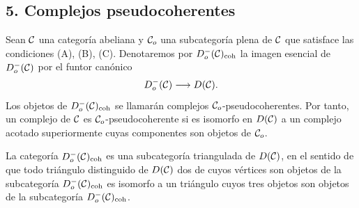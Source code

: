 \subsection*{5. Complejos pseudocoherentes}

Sean $\mathcal C$ una categoría abeliana y $\mathcal C_o$ una subcategoría plena de $\mathcal C$ que satisface las condiciones (A), (B), (C). Denotaremos por $D_o^-(\mathcal C)_{\mathrm{coh}}$ la imagen esencial de $D_o^-(\mathcal C)$ por el funtor canónico
\[
D_o^-(\mathcal C)\longrightarrow D(\mathcal C).
\]
Los objetos de $D_o^-(\mathcal C)_{\mathrm{coh}}$ se llamarán complejos $\mathcal C_o$-pseudocoherentes. Por tanto, un complejo de $\mathcal C$ es $\mathcal C_o$-pseudocoherente si es isomorfo en $D(\mathcal C)$ a un complejo acotado superiormente cuyas componentes son objetos de $\mathcal C_o$.

La categoría $D_o^-(\mathcal C)_{\mathrm{coh}}$ es una subcategoría triangulada de $D(\mathcal C)$, en el sentido de que todo triángulo distinguido de $D(\mathcal C)$ dos de cuyos vértices son objetos de la subcategoría $D_o^-(\mathcal C)_{\mathrm{coh}}$ es isomorfo a un triángulo cuyos tres objetos son objetos de la subcategoría $D_o^-(\mathcal C)_{\mathrm{coh}}$.

